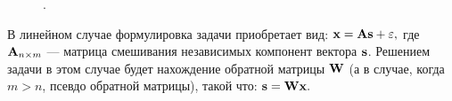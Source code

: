 \begin{figure}[ht]
    \caption{.}
    \label{img:ica_compare_with_pca}
\end{figure}

В линейном случае формулировка задачи приобретает вид: $\mathrm{\mathbf{x}} = \mathrm{\mathbf{A}} \mathrm{\mathbf{s}} + \varepsilon,$ где $\mathrm{\mathbf{A}}_{n \times m}$ --- матрица смешивания независимых компонент вектора $\mathrm{\mathbf{s}}$. Решением задачи в этом случае будет нахождение обратной матрицы $\mathrm{\mathbf{W}}$ (а в случае, когда $m > n$, псевдо обратной матрицы), такой что: $\mathrm{\mathbf{s}} = \mathrm{\mathbf{W}} \mathrm{\mathbf{x}}.$

